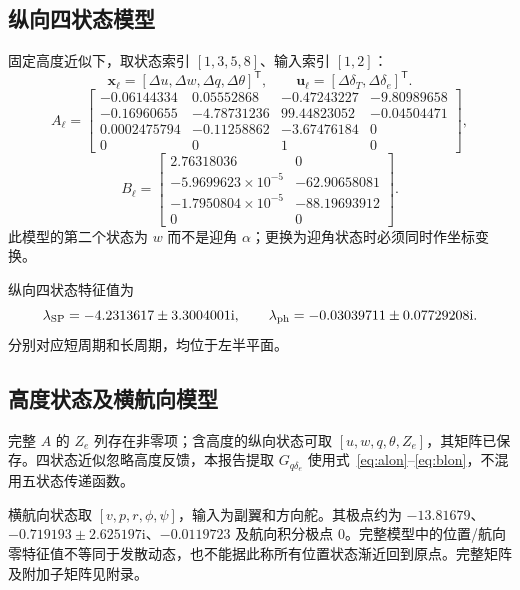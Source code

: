 \documentclass[UTF8,a4paper,11pt,fontset=windows]{ctexart}
\newcommand{\de}{\delta_e}
\newcommand{\dt}{\delta_T}
\newcommand{\Gq}{G_{q\delta_e}}
\begin{document}
\subsection{纵向四状态模型}
固定高度近似下，取状态索引 $[1,3,5,8]$、输入索引 $[1,2]$：
\begin{equation}
\bm x_\ell=[\Delta u,\Delta w,\Delta q,\Delta\theta]^{\mathsf T},\qquad
\bm u_\ell=[\Delta\dt,\Delta\de]^{\mathsf T}.
\end{equation}
\begin{equation}\label{eq:alon}
A_\ell=\begin{bmatrix}
-0.06144334&0.05552868&-0.47243227&-9.80989658\\
-0.16960655&-4.78731236&99.44823052&-0.04504471\\
0.0002475794&-0.11258862&-3.67476184&0\\
0&0&1&0
\end{bmatrix},
\end{equation}
\begin{equation}\label{eq:blon}
B_\ell=\begin{bmatrix}
2.76318036&0\\
-5.9699623\times10^{-5}&-62.90658081\\
-1.7950804\times10^{-5}&-88.19693912\\
0&0
\end{bmatrix}.
\end{equation}
此模型的第二个状态为 $w$ 而不是迎角 $\alpha$；更换为迎角状态时必须同时作坐标变换。

纵向四状态特征值为
\begin{equation}
\lambda_{\rm SP}=-4.2313617\pm3.3004001\mathrm i,\qquad
\lambda_{\rm ph}=-0.03039711\pm0.07729208\mathrm i.
\end{equation}
分别对应短周期和长周期，均位于左半平面。

\subsection{高度状态及横航向模型}
完整 $A$ 的 $Z_e$ 列存在非零项；含高度的纵向状态可取 $[u,w,q,\theta,Z_e]$，其矩阵已保存。四状态近似忽略高度反馈，本报告提取 $\Gq$ 使用式~\eqref{eq:alon}--\eqref{eq:blon}，不混用五状态传递函数。

横航向状态取 $[v,p,r,\phi,\psi]$，输入为副翼和方向舵。其极点约为 $-13.81679$、$-0.719193\pm2.625197\mathrm i$、$-0.0119723$ 及航向积分极点 0。完整模型中的位置/航向零特征值不等同于发散动态，也不能据此称所有位置状态渐近回到原点。完整矩阵及附加子矩阵见附录。
\end{document}
